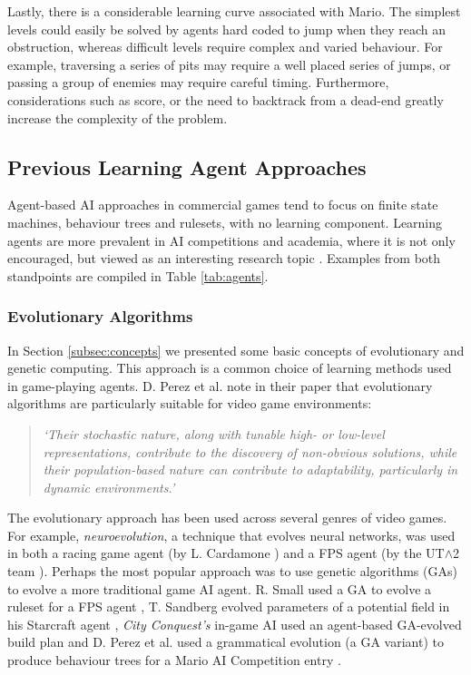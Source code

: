 Lastly, there is a considerable learning curve associated with Mario. The simplest levels could easily be solved by agents hard coded to jump when they reach an obstruction, whereas difficult levels require complex and varied behaviour. For example, traversing a series of pits may require a well placed series of jumps, or passing a group of enemies may require careful timing. Furthermore, considerations such as score, or the need to backtrack from a dead-end greatly increase the complexity of the problem. \cite[p.~3, p.~12]{2012the}



\subsection{Previous Learning Agent Approaches}
\label{ssec:prevagents}

Agent-based AI approaches in commercial games tend to focus on finite state machines, behaviour trees and rulesets, with no learning component. Learning agents are more prevalent in AI competitions and academia, where it is not only encouraged, but viewed as an interesting research topic \cite[p.~1]{marioaicomp}. Examples from both standpoints are compiled in Table \ref{tab:agents}.

\subsubsection{Evolutionary Algorithms}

In Section \ref{subsec:concepts} we presented some basic concepts of evolutionary and genetic computing. This approach is a common choice of learning methods used in game-playing agents. D. Perez et al. note in their paper \cite[p.~1]{gramev} that evolutionary algorithms are particularly suitable for video game environments: 
\begin{quote}\itshape
`Their stochastic nature, along with tunable high- or low-level representations, contribute to the discovery of non-obvious solutions, while their population-based nature can contribute to adaptability, particularly in dynamic environments.'
\end{quote}
The evolutionary approach has been used across several genres of video games. For example, \emph{neuroevolution}, a technique that evolves neural networks, was used in both a racing game agent (by L. Cardamone \cite[p.~137]{scrc}) and a FPS agent (by the UT$\wedge$2 team \cite{2kbot}). Perhaps the most popular approach was to use genetic algorithms (GAs) to evolve a more traditional game AI agent. R. Small used a GA to evolve a ruleset for a FPS agent \cite{agentsmith}, T. Sandberg evolved parameters of a potential field in his Starcraft agent \cite{emapf} , \emph{City Conquest's} in-game AI used an agent-based GA-evolved build plan \cite{evolutioningamedesign} and D. Perez et al. used a grammatical evolution (a GA variant) to produce behaviour trees for a Mario AI Competition entry \cite{gramev}.

